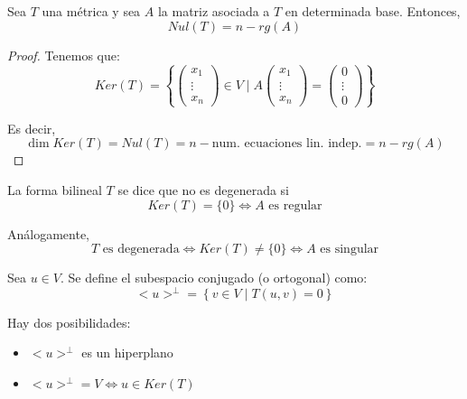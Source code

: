\begin{prop} Sea $T$ una métrica y sea $A$ la matriz asociada a $T$ en determinada base. Entonces,
    \begin{equation*}
        Nul(T) = n -rg(A)
    \end{equation*}
\end{prop}
\begin{proof}
    Tenemos que:
    \begin{equation*}
        Ker(T) = \left\{ \left(\begin{array}{c}
            x_1 \\ \vdots \\ x_n
        \end{array} \right) \in V \mid A\left(\begin{array}{c}
            x_1 \\ \vdots \\ x_n
        \end{array} \right)=\left(\begin{array}{c}
            0 \\ \vdots \\ 0
        \end{array} \right)\right\}
    \end{equation*}

    Es decir,
    \begin{equation*}
        \dim Ker(T) = Nul(T) = n - \text{num. ecuaciones lin. indep.} = n-rg(A)
    \end{equation*}
\end{proof}

\begin{definicion}
    La forma bilineal $T$ se dice que no es degenerada si
    $$Ker(T) = \{0\} \Longleftrightarrow A \text{ es regular}$$

    Análogamente,
    $$T \text{ es degenerada} \Longleftrightarrow Ker(T) \neq \{0\} \Longleftrightarrow A \text{ es singular}$$
\end{definicion}

\begin{definicion}
    Sea $u\in V$. Se define el subespacio conjugado (o ortogonal) como:
    \begin{equation*}
        <u>^{\perp} = \left\{ v\in V \mid T(u,v)=0\right\}
    \end{equation*}
\end{definicion}
Hay dos posibilidades:
\begin{itemize}
    \item $<u>^{\perp}$ es un hiperplano
    \item $<u>^{\perp} = V \Longleftrightarrow u\in Ker(T)$ 
\end{itemize}


